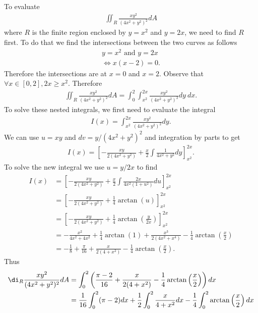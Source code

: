 \documentclass{article}
\begin{document}
To evaluate
\begin{align*}
	\iint_R\frac{xy^2}{(4x^2+y^2)^2}dA
\end{align*}
where $R$ is the finite region enclosed by $y=x^2$ and $y=2x$,
we need to find $R$ first. To do that we find the intersections between the
two curves as follows
\begin{align*}
	y=x^2 \text{ and } y = 2x \\
	\Leftrightarrow x(x-2)=0.
\end{align*}
Therefore the intersections are at $x=0$ and $x=2$. Observe that
$\forall x\in[0,2], 2x\geq x^2$. Therefore
\begin{align*}
	\iint_R \frac{xy^2}{(4x^2+y^2)^2} dA
	= \int_0^2\int_{x^2}^{2x} \frac{xy^2}{(4x^2+y^2)^2}dy\: dx.
\end{align*}
To solve these nested integrals, we first need to evaluate the
integral
\begin{align*}
	I(x) = \int_{x^2}^{2x} \frac{xy^2}{(4x^2+y^2)^2}dy.
\end{align*}
We can use $u=xy$ and $dv=y/(4x^2+y^2)^2$ and integration by
parts to get
\begin{align*}
	I(x) = \left[-\frac{xy}{2(4x^2+y^2)}+\frac{x}{2}\int \frac{1}{4x^2+y^2}dy\right]_{x^2}^{2x}.
\end{align*}
To solve the new integral we use $u=y/2x$ to find
\begin{align*}
	I(x) & = \left[-\frac{xy}{2(4x^2+y^2)}+\frac{x}{2}\int \frac{2x}{4x^2(1+u^2)}du\right]_{x^2}^{2x}    \\
	     & = \left[-\frac{xy}{2(4x^2+y^2)}+\frac{1}{4}\arctan(u)\right]_{x^2}^{2x}                       \\
	     & = \left[-\frac{xy}{2(4x^2+y^2)}+\frac{1}{4}\arctan\left(\frac{y}{2x}\right)\right]_{x^2}^{2x} \\
	     & =-\frac{x^2}{4x^2+4x^2}+\frac{1}{4}\arctan(1)+\frac{x^3}{2(4x^2+x^4)}
	-\frac{1}{4}\arctan\left(\frac{x}{2}\right)                                                          \\
	     & =-\frac{1}{8}+\frac{\pi}{16}+\frac{x}{2(4+x^2)}-\frac{1}{4}\arctan\left(\frac{x}{2}\right).
\end{align*}
Thus
\begin{align*}
	\di_R\frac{xy^2}{(4x^2+y^2)^2}dA & =\int_0^2\left(\frac{\pi-2}{16}+\frac{x}{2(4+x^2)}-\frac{1}{4}\arctan\left(\frac{x}{2}\right)\right)dx                   \\
	                                 & =\frac{1}{16}\int_0^2(\pi-2)dx+\frac{1}{2}\int_0^2\frac{x}{4+x^2}dx-\frac{1}{4}\int_0^2\arctan\left(\frac{x}{2}\right)dx
\end{align*}
\end{document}
